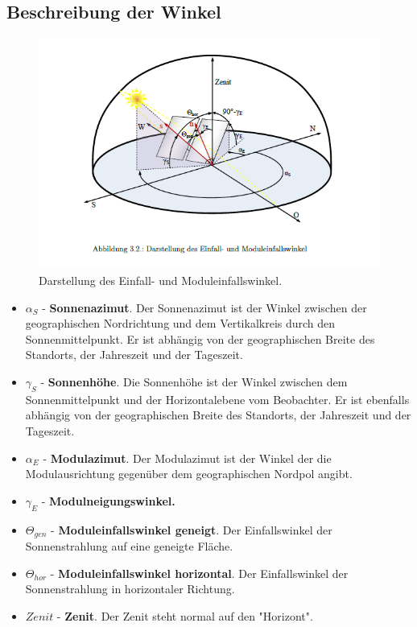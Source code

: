 \documentclass[a4paper,12pt]{article}
\begin{document}
	\subsection{Beschreibung der Winkel}
	\begin{figure}[H]
		\centering
		\includegraphics[width=12cm]{img/Winkel}
		\caption{Darstellung des Einfall- und Moduleinfallswinkel.}
	\end{figure}
	\begin{itemize}
		\item $\alpha_S$ - \textbf{Sonnenazimut}. Der Sonnenazimut ist der Winkel zwischen der geographischen Nordrichtung und dem Vertikalkreis durch den Sonnenmittelpunkt. Er ist abhängig von der geographischen Breite des Standorts, der Jahreszeit und der Tageszeit.
		\item $\gamma_S$ - \textbf{Sonnenhöhe}. Die Sonnenhöhe ist der Winkel zwischen dem Sonnenmittelpunkt und der Horizontalebene vom Beobachter. Er ist ebenfalls abhängig von der geographischen Breite des Standorts, der Jahreszeit und der Tageszeit. 
		\item $\alpha_E$ - \textbf{Modulazimut}. Der Modulazimut ist der Winkel der die Modulausrichtung gegenüber dem geographischen Nordpol angibt.
		\item $\gamma_E$ - \textbf{Modulneigungswinkel.}
		\item $\Theta_{gen}$ - \textbf{Moduleinfallswinkel geneigt}. Der Einfallswinkel der Sonnenstrahlung auf eine geneigte Fläche.
		\item $\Theta_{hor}$ - \textbf{Moduleinfallswinkel horizontal}. Der Einfallswinkel der Sonnenstrahlung in horizontaler Richtung.
		\item $Zenit$ - \textbf{Zenit}. Der Zenit steht normal auf den "Horizont".
	\end{itemize}
\end{document}
